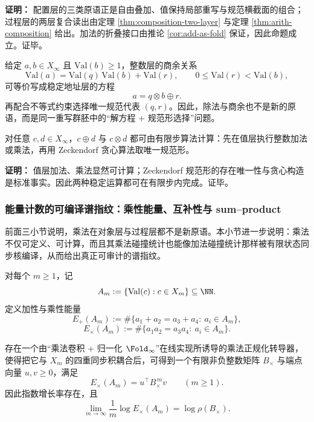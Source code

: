 \textbf{证明：}
配置层的三类原语正是自由叠加、值保持局部重写与规范横截面的组合；过程层的两层复合读出由定理 \ref{thm:composition-two-layer} 与定理 \ref{thm:arith-composition} 给出。加法的折叠接口由推论 \ref{cor:add-as-fold} 保证，因此命题成立。证毕。

\begin{remark}[商余作为规范形选择]\label{rem:division-as-selection}
给定 \(a,b\in X_\infty\) 且 \(\mathrm{Val}(b)\ge 1\)，整数层的商余关系
\[
\mathrm{Val}(a)=\mathrm{Val}(q)\,\mathrm{Val}(b)+\mathrm{Val}(r),
\qquad
0\le \mathrm{Val}(r)<\mathrm{Val}(b),
\]
可等价写成稳定地址层的方程
\[
a=q\otimes b\oplus r.
\]
再配合不等式约束选择唯一规范代表 \((q,r)\)。因此，除法与商余也不是新的原语，而是同一重写群胚中的“解方程 + 规范形选择”问题。
\end{remark}

\begin{proposition}[可计算实现]\label{prop:zeckendorf-arith-computable}
对任意 \(c,d\in X_\infty\)，\(c\oplus d\) 与 \(c\otimes d\) 都可由有限步算法计算：先在值层执行整数加法或乘法，再用 Zeckendorf 贪心算法取唯一规范形。
\end{proposition}

\textbf{证明：}
值层加法、乘法显然可计算；Zeckendorf 规范形的存在唯一性与贪心构造是标准事实。因此两种稳定运算都可在有限步内完成。证毕。

\subsubsection{能量计数的可编译谱指纹：乘性能量、互补性与 sum--product}\label{subsec:energy-compiled-sumproduct}
前面三小节说明，乘法在对象层与过程层都不是新原语。本小节进一步说明：乘法不仅可定义、可计算，而且其乘法碰撞统计也能像加法碰撞统计那样被有限状态同步核编译，从而给出真正可审计的谱指纹。

对每个 \(m\ge 1\)，记
\[
A_m:=\{\mathrm{Val}(c):c\in X_m\}\subseteq \NN.
\]
定义加性与乘性能量
\[
E_+(A_m):=
\#\{a_1+a_2=a_3+a_4:\ a_i\in A_m\},
\]
\[
E_\times(A_m):=
\#\{a_1a_2=a_3a_4:\ a_i\in A_m\}.
\]

\begin{proposition}[乘性能量同样可编译]\label{prop:conclusion71-multiplicative-energy-compilable}
存在一个由“乘法卷积 + 归一化 \(\Fold_\infty\)”在线实现所诱导的乘法正规化转导器，使得把它与 \(X_m\) 的四重同步积耦合后，可得到一个有限非负整数矩阵 \(B_\times\) 与端点向量 \(u,v\ge 0\)，满足
\[
E_\times(A_m)=u^\top B_\times^{\,m}v
\qquad (m\ge 1).
\]
因此指数增长率存在，且
\[
\lim_{m\to\infty}\frac{1}{m}\log E_\times(A_m)=\log \rho(B_\times).
\]
\end{proposition}

